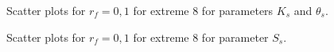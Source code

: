 \documentclass[review]{elsarticle}
\begin{document}
\begin{figure}[htb!]
\label{ext6rf0-Kt3}
\caption{Scatter plots for $r_f=0,1$ for extreme 8 for parameters $K_s$ and $\theta_s$. }
\end{figure}

\begin{figure}[htb!]
\label{ext6rf0-Ss3}
\caption{Scatter plots for $r_f=0,1$ for extreme 8 for parameter $S_s$.}
\end{figure}
\end{document}
